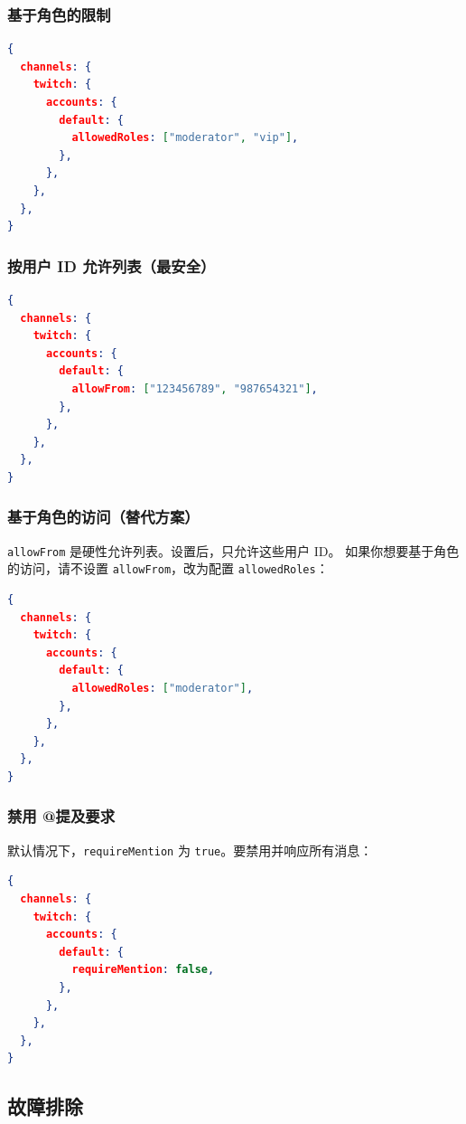 \subsubsection{基于角色的限制}


\begin{lstlisting}[language=json]
{
  channels: {
    twitch: {
      accounts: {
        default: {
          allowedRoles: ["moderator", "vip"],
        },
      },
    },
  },
}
\end{lstlisting}


\subsubsection{按用户 ID 允许列表（最安全）}


\begin{lstlisting}[language=json]
{
  channels: {
    twitch: {
      accounts: {
        default: {
          allowFrom: ["123456789", "987654321"],
        },
      },
    },
  },
}
\end{lstlisting}


\subsubsection{基于角色的访问（替代方案）}


\texttt{allowFrom} 是硬性允许列表。设置后，只允许这些用户 ID。
如果你想要基于角色的访问，请不设置 \texttt{allowFrom}，改为配置 \texttt{allowedRoles}：

\begin{lstlisting}[language=json]
{
  channels: {
    twitch: {
      accounts: {
        default: {
          allowedRoles: ["moderator"],
        },
      },
    },
  },
}
\end{lstlisting}


\subsubsection{禁用 @提及要求}


默认情况下，\texttt{requireMention} 为 \texttt{true}。要禁用并响应所有消息：

\begin{lstlisting}[language=json]
{
  channels: {
    twitch: {
      accounts: {
        default: {
          requireMention: false,
        },
      },
    },
  },
}
\end{lstlisting}


\subsection{故障排除}


